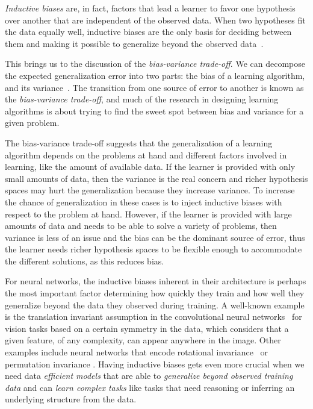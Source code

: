 \emph{Inductive biases} are, in fact, factors that lead a learner to favor one hypothesis over another that are independent of the observed data. When two hypotheses fit the data equally well, inductive biases are the only basis for deciding between them and making it possible to generalize beyond the observed data~\citep{Mitchell80theneed}.

This brings us to the discussion of the \emph{bias-variance trade-off}.
We can decompose the expected generalization error into two parts: the
bias of a learning algorithm, and its variance~\citep{geman1992neural}. The transition from one source of error to another is known as the \emph{bias-variance trade-off}, and much of the research in designing learning algorithms is about trying to find the sweet spot between bias and variance for a given problem. 

The bias-variance trade-off suggests that the generalization of a learning algorithm depends on the problems at hand and different factors involved in learning, like the amount of available data. 
If the learner is provided with only small amounts of data, then the variance is the real concern and richer hypothesis spaces may hurt the generalization because they increase variance.  To increase the chance of generalization in these cases is to inject inductive biases with respect to the problem at hand.
However, if the learner is provided with large amounts of data and needs to be able to solve a variety of problems, then variance is less of an issue and the bias can be the dominant source of error, thus the learner needs richer hypothesis spaces to be flexible enough to accommodate the different solutions, as this reduces bias.

For neural networks, the inductive biases inherent in their architecture is perhaps the most important factor determining how quickly they train and how well they generalize beyond the data they observed during training. 
A well-known example is the translation invariant assumption in the convolutional neural networks~\citep{lecun1989backpropagation} for vision tasks based on a certain symmetry in the data, which considers that a given feature, of any complexity, can appear anywhere in the image.   Other examples include neural networks that encode rotational invariance~\citep{cohen2016steerable} or permutation invariance \citep{zaheer2017deep, lee2018set}.
Having inductive biases gets even more crucial when we need data \emph{efficient models} that are able to \emph{generalize beyond observed training data} and can \emph{learn complex tasks} like tasks that need reasoning or inferring an underlying structure from the data.

